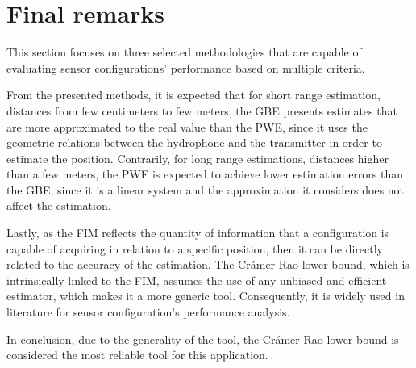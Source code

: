 \section{Final remarks}

This section focuses on three selected methodologies that are capable of evaluating sensor configurations' performance based on multiple criteria.

From the presented methods, it is expected that for short range estimation, distances from few centimeters to few meters,  the GBE presents estimates that are more approximated to the real value than the PWE, since it uses the geometric relations between the hydrophone and the transmitter in order to estimate the position. Contrarily, for long range estimations, distances higher than a few meters, the PWE is expected to achieve lower estimation errors than the GBE, since it is a linear system and the approximation it considers does not affect the estimation.

Lastly, as the FIM reflects the quantity of information that a configuration is capable of acquiring in relation to a specific position, then it can be directly related to the accuracy of the estimation. The Crámer-Rao lower bound, which is intrinsically linked to the FIM, assumes the use of any unbiased and efficient estimator, which makes it a more generic tool. Consequently, it is widely used in literature for sensor configuration's performance analysis. 

In conclusion, due to the generality of the tool, the Crámer-Rao lower bound is considered the most reliable tool for this application.

